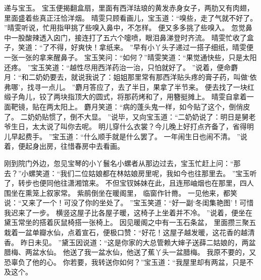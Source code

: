递与宝玉。
宝玉便揭翻盒扇，里面有西洋珐琅的黄发赤身女子，两肋又有肉翅，里面盛着些真正汪恰洋烟。
晴雯只顾看画儿，宝玉道：“嗅些，走了气就不好了。
”晴雯听说，忙用指甲挑了些嗅入鼻中，不怎样。
便又多多挑了些嗅入。
忽觉鼻中一股酸辣透入囟门，接连打了五六个嚏喷，眼泪鼻涕登时齐流。
晴雯忙收了盒子，笑道：“了不得，好爽快！拿纸来。
”早有小丫头子递过一搭子细纸，晴雯便一张一张的拿来醒鼻子。
宝玉笑问：“如何？”晴雯笑道：“果觉通快些，只是太阳还疼。
”宝玉笑道：“越性尽用西洋药治一治，只怕就好了。
”说着，便命麝月：“和二奶奶要去，就说我说了：姐姐那里常有那西洋贴头疼的膏子药，叫做‘依弗哪’，找寻一点儿。
”麝月答应了，去了半日，果拿了半节来。
便去找了一块红缎子角儿，铰了两块指顶大的圆式，将那药烤和了，用簪挺摊上。
晴雯自拿着一面靶镜，贴在两太阳上。
麝月笑道：“病的蓬头鬼一样，如今贴了这个，倒俏皮了。
二奶奶贴惯了，倒不大显。
”说毕，又向宝玉道：“二奶奶说了：明日是舅老爷生日，太太说了叫你去呢。
明儿穿什么衣裳？今儿晚上好打点齐备了，省得明儿早起费手。
”宝玉道：“什么顺手就是什么罢了。
一年闹生日也闹不清。
”说着，便起身出房，往惜春房中去看画。
\par
刚到院门外边，忽见宝琴的小丫鬟名小螺者从那边过去，宝玉忙赶上问：“那去？”小螺笑道：“我们二位姑娘都在林姑娘房里呢，我如今也往那里去。
”宝玉听了，转步也便同他往潇湘馆来。
不但宝钗姊妹在此，且连邢岫烟也在那里，四人围坐在熏笼上叙家常。
紫鹃倒坐在暖阁里，
临窗作针黹。
一见他来，都笑说：“又来了一个！可没了你的坐处了。
”宝玉笑道：“好一副‘冬闺集艳图’！可惜我迟来了一步。
横竖这屋子比各屋子暖，这椅子上坐着并不冷。
”说着，便坐在黛玉常坐的搭着灰鼠椅搭一张椅上。
因见暖阁之中有一玉石条盆，
里面攒三聚五栽着一盆单瓣水仙，点着宣石，便极口赞：“好花！这屋子越发暖，这花香的越清香。
昨日未见。
”黛玉因说道：“这是你家的大总管赖大婶子送薛二姑娘的，两盆腊梅、两盆水仙。
他送了我一盆水仙，他送了蕉丫头一盆腊梅。
我原不要的，又恐辜负了他的心。
你若要，我转送你如何？”宝玉道：“我屋里却有两盆，只是不及这个。
